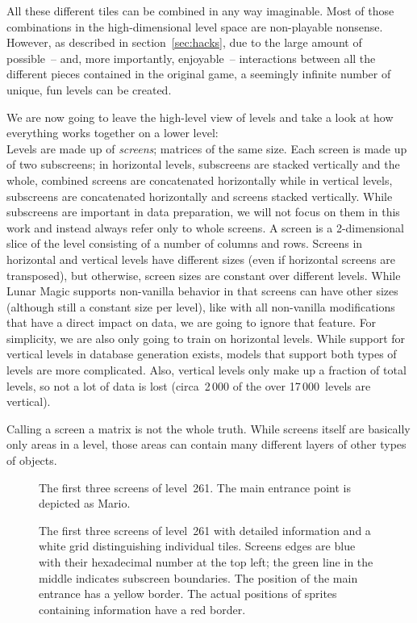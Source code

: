 All these different tiles can be combined in any way imaginable. Most
of those combinations in the high-dimensional level space are
non-playable nonsense. However, as described in
section~\ref{sec:hacks}, due to the large amount of possible~-- and,
more importantly, enjoyable~-- interactions between all the different
pieces contained in the original game, a seemingly infinite number of
unique, fun levels can be created.
\medskip

We are now going to leave the high-level view of levels and take a
look at how everything works together on a lower level: \\
Levels are made up of \emph{screens}; matrices of the same size. Each
screen is made up of two subscreens; in horizontal levels, subscreens
are stacked vertically and the whole, combined screens are
concatenated horizontally while in vertical levels, subscreens are
concatenated horizontally and screens stacked vertically. While
subscreens are important in data preparation, we will not focus on
them in this work and instead always refer only to whole screens. A
screen is a 2-dimensional slice of the level consisting of a number of
columns and rows. Screens in horizontal and vertical levels have
different sizes (even if horizontal screens are transposed), but
otherwise, screen sizes are constant over different levels. While
Lunar Magic supports non-vanilla behavior in that screens can have
other sizes (although still a constant size per level), like with all
non-vanilla modifications that have a direct impact on data, we are
going to ignore that feature. For simplicity, we are also only going
to train on horizontal levels. While support for vertical levels in
database generation exists, models that support both types of levels
are more complicated. Also, vertical levels only make up a fraction of
total levels, so not a lot of data is lost (circa~2\,000 of the over
17\,000~levels are vertical).

Calling a screen a matrix is not the whole truth. While screens itself
are basically only areas in a level, those areas can contain many
different layers of other types of objects.

\begin{figure}[t]
  \centering
  \caption{The first three screens of level~261. The main entrance
    point is depicted as Mario.}
  \label{fig:105-clean}
\end{figure}

\begin{figure}[t]
  \centering
  \caption{The first three screens of level~261 with detailed
    information and a white grid distinguishing individual tiles.
    Screens edges are blue with their hexadecimal number at the top
    left; the green line in the middle indicates subscreen boundaries.
    The position of the main entrance has a yellow border. The actual
    positions of sprites containing information have a red border.}
  \label{fig:105-detailed}
\end{figure}

